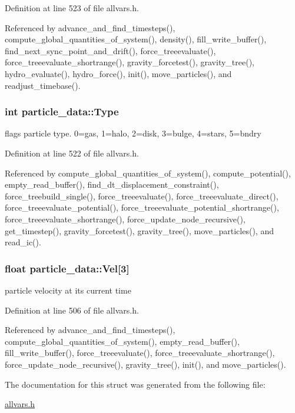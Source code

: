 Definition at line 523 of file allvars.h.



Referenced by advance\_\-and\_\-find\_\-timesteps(), compute\_\-global\_\-quantities\_\-of\_\-system(), density(), fill\_\-write\_\-buffer(), find\_\-next\_\-sync\_\-point\_\-and\_\-drift(), force\_\-treeevaluate(), force\_\-treeevaluate\_\-shortrange(), gravity\_\-forcetest(), gravity\_\-tree(), hydro\_\-evaluate(), hydro\_\-force(), init(), move\_\-particles(), and readjust\_\-timebase().

\hypertarget{structparticle__data_ab6119b261ff95e8f84ae171139704cbd}{
\subsubsection[{Type}]{\setlength{\rightskip}{0pt plus 5cm}int {\bf particle\_\-data::Type}}}
\label{structparticle__data_ab6119b261ff95e8f84ae171139704cbd}
flags particle type. 0=gas, 1=halo, 2=disk, 3=bulge, 4=stars, 5=bndry 

Definition at line 522 of file allvars.h.



Referenced by compute\_\-global\_\-quantities\_\-of\_\-system(), compute\_\-potential(), empty\_\-read\_\-buffer(), find\_\-dt\_\-displacement\_\-constraint(), force\_\-treebuild\_\-single(), force\_\-treeevaluate(), force\_\-treeevaluate\_\-direct(), force\_\-treeevaluate\_\-potential(), force\_\-treeevaluate\_\-potential\_\-shortrange(), force\_\-treeevaluate\_\-shortrange(), force\_\-update\_\-node\_\-recursive(), get\_\-timestep(), gravity\_\-forcetest(), gravity\_\-tree(), move\_\-particles(), and read\_\-ic().

\hypertarget{structparticle__data_ad7808af1e23fbd920d7eb477bc68bd00}{
\subsubsection[{Vel}]{\setlength{\rightskip}{0pt plus 5cm}float {\bf particle\_\-data::Vel}\mbox{[}3\mbox{]}}}
\label{structparticle__data_ad7808af1e23fbd920d7eb477bc68bd00}
particle velocity at its current time 

Definition at line 506 of file allvars.h.



Referenced by advance\_\-and\_\-find\_\-timesteps(), compute\_\-global\_\-quantities\_\-of\_\-system(), empty\_\-read\_\-buffer(), fill\_\-write\_\-buffer(), force\_\-treeevaluate(), force\_\-treeevaluate\_\-shortrange(), force\_\-update\_\-node\_\-recursive(), gravity\_\-tree(), init(), and move\_\-particles().



The documentation for this struct was generated from the following file:\begin{DoxyCompactItemize}
\item 
\hyperlink{allvars_8h}{allvars.h}\end{DoxyCompactItemize}
